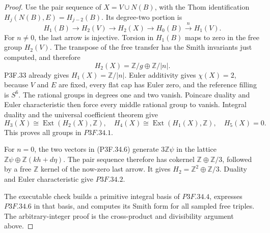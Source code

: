 \begin{proof}
Use the pair sequence of \(X=V\cup N(B)\), with the Thom identification \(H_j(N(B),E)=H_{j-2}(B)\). Its degree-two portion is \[
 H_1(B)\longrightarrow H_2(V)\longrightarrow H_2(X)
 \longrightarrow H_0(B)\xrightarrow{\ n\ }H_1(V).
\] For \(n\ne0\), the last arrow is injective. Torsion in \(H_1(B)\) maps to zero in the free group \(H_2(V)\). The transpose of the free transfer has the Smith invariants just computed, and therefore \[
                   H_2(X)=\mathbb Z/g\oplus\mathbb Z/|n|.
\] P3F.33 already gives \(H_1(X)=\mathbb Z/|n|\). Euler additivity gives \(\chi(X)=2\), because \(V\) and \(E\) are fixed, every flat cap has Euler zero, and the reference filling is \(S^6\). The rational groups in degrees one and two vanish. Poincare duality and Euler characteristic then force every middle rational group to vanish. Integral duality and the universal coefficient theorem give \[
 H_3(X)\cong\operatorname{Ext}(H_2(X),\mathbb Z),\quad
 H_4(X)\cong\operatorname{Ext}(H_1(X),\mathbb Z),\quad
 H_5(X)=0.
\] This proves all groups in \(P3F.34.1\).

For \(n=0\), the two vectors in (P3F.34.6) generate \(3\mathbb Z\psi\) in the lattice \(\mathbb Z\psi\oplus\mathbb Z(kh+d\eta)\). The pair sequence therefore has cokernel \(\mathbb Z\oplus\mathbb Z/3\), followed by a free \(\mathbb Z\) kernel of the now-zero last arrow. It gives \(H_2=\mathbb Z^2\oplus\mathbb Z/3\). Duality and Euler characteristic give \(P3F.34.2\).

The executable check builds a primitive integral basis of \(P3F.34.4\), expresses \(P3F.34.6\) in that basis, and computes its Smith form for all sampled free triples. The arbitrary-integer proof is the cross-product and divisibility argument above.
\end{proof}
